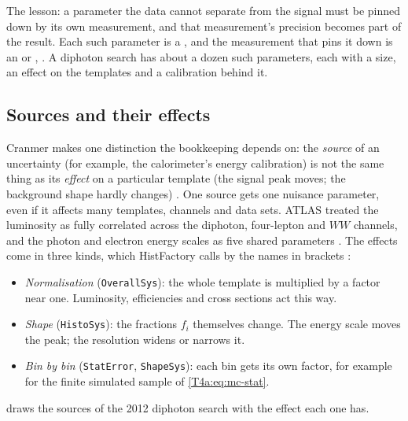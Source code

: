 The lesson: a parameter the data cannot separate from the signal must be pinned down by its own measurement, and that measurement's precision becomes part of the result. Each such parameter is a  , and the measurement that pins it down is an  or  \cite[Sec.~2.2]{Cranmer2015}, \cite[\S40.2.2.2]{PDG2024}. A diphoton search has about a dozen such parameters, each with a size, an effect on the templates and a calibration behind it.

\subsection{Sources and their effects}
\label{T4a:sec:sources}

Cranmer makes one distinction the bookkeeping depends on: the \emph{source} of an uncertainty (for example, the calorimeter's energy calibration) is not the same thing as its \emph{effect} on a particular template (the signal peak moves; the background shape hardly changes) \cite[Sec.~4.1.4]{Cranmer2015}. One source gets one nuisance parameter, even if it affects many templates, channels and data sets. ATLAS treated the luminosity as fully correlated across the diphoton, four-lepton and $WW$ channels, and the photon and electron energy scales as five shared parameters \cite[Sec.~8]{AadHiggs2012}. The effects come in three kinds, which HistFactory calls by the names in brackets \cite[Table~1]{HistFactory2012}:
\begin{itemize}[itemsep=1pt,leftmargin=1.2em]
  \item \emph{Normalisation} (\texttt{OverallSys}): the whole template is multiplied by a factor near one. Luminosity, efficiencies and cross sections act this way.
  \item \emph{Shape} (\texttt{HistoSys}): the fractions $f_i$ themselves change. The energy scale moves the peak; the resolution widens or narrows it.
  \item \emph{Bin by bin} (\texttt{StatError}, \texttt{ShapeSys}): each bin gets its own factor, for example for the finite simulated sample of \eqref{T4a:eq:mc-stat}.
\end{itemize}
 draws the sources of the 2012 diphoton search with the effect each one has.

